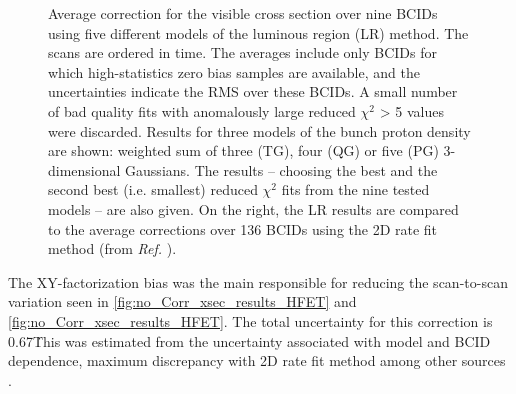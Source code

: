 \begin{figure}[!htb]
	\centering
	\caption[Factorization corrections on visible cross-section from luminous region method.]{Average correction for the visible cross section over nine BCIDs using five different models of the luminous region (LR) method. The scans are ordered in time. The averages include only BCIDs for which high-statistics zero bias samples are available, and the uncertainties indicate the RMS over these BCIDs. A small number of bad quality fits with anomalously large reduced $\chi^2$ > 5 values were discarded. Results for three models of the bunch proton density are shown: weighted sum of three (TG), four (QG) or five (PG) 3-dimensional Gaussians. The results – choosing the best and the second best (i.e. smallest) reduced $\chi^2$ fits from the nine tested models – are also given. On the right, the LR results are compared to the average corrections over 136 BCIDs using the 2D rate fit method (from \textit{Ref.} \cite{CMS-DP-2024-068}).}
	\label{fig:luminous_region_vs_2d_rate_fit}
\end{figure}

The XY-factorization bias was the main responsible for reducing the scan-to-scan variation seen in \autoref{fig:no_Corr_xsec_results_HFET} and \autoref{fig:no_Corr_xsec_results_HFET}. The total uncertainty for this correction is 0.67\. This was estimated from the uncertainty associated with model and BCID dependence, maximum discrepancy with 2D rate fit method among other sources \cite{CMS-PAS-LUM-22-001}.

